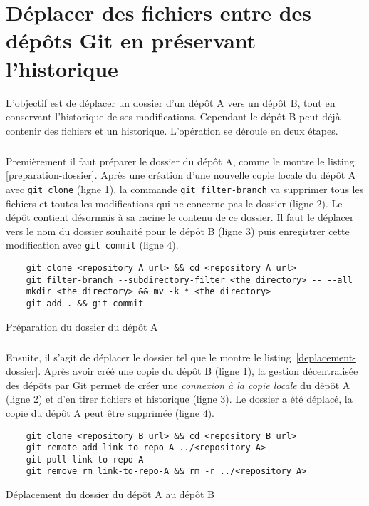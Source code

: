 \chapter[Déplacer des fichiers entre des dépôts Git en préservant l'historique]
  {Déplacer des fichiers entre des dépôts Git en préservant l'historique\footnotemark}
\label{deplacer-historique-depots}

  
L'objectif est de déplacer un dossier d'un dépôt A vers un dépôt B, tout en conservant
l'historique de ses modifications. Cependant le dépôt B peut déjà contenir des 
fichiers et un historique.
L'opération se déroule en deux étapes.

\paragraph{}
Premièrement il faut préparer le dossier du dépôt A, comme le montre le listing~
\ref{preparation-dossier}.
Après une création d'une nouvelle copie locale du dépôt A avec \texttt{git clone} (ligne 1),
la commande \texttt{git filter-branch} va supprimer tous les fichiers et
toutes les modifications qui ne concerne pas le dossier (ligne 2). Le dépôt contient
désormais à sa racine le contenu de ce dossier. Il faut le déplacer vers le nom du
dossier souhaité pour le dépôt B (ligne 3) puis enregistrer cette modification avec \texttt{git commit} (ligne 4).
\begin{listing}
  \begin{verbatim}
    git clone <repository A url> && cd <repository A url>
    git filter-branch --subdirectory-filter <the directory> -- --all
    mkdir <the directory> && mv -k * <the directory>
    git add . && git commit
  \end{verbatim}
  \caption{Préparation du dossier du dépôt A}
  \label{preparation-dossier}
\end{listing}

\paragraph{}
Ensuite, il s'agit de déplacer le dossier tel que le montre le listing~\ref{deplacement-dossier}.
Après avoir créé une copie du dépôt B (ligne 1), la gestion décentralisée des dépôts
par Git permet de créer une \emph{connexion à la copie locale} du dépôt A (ligne 2) et d'en tirer fichiers
et historique (ligne 3). Le dossier a été déplacé, la copie du dépôt A peut être supprimée (ligne 4).
\begin{listing}
  \begin{verbatim}
    git clone <repository B url> && cd <repository B url>
    git remote add link-to-repo-A ../<repository A>
    git pull link-to-repo-A
    git remove rm link-to-repo-A && rm -r ../<repository A>
  \end{verbatim}
  \caption{Déplacement du dossier du dépôt A au dépôt B}
  \label{deplacement-dossier}
\end{listing}

